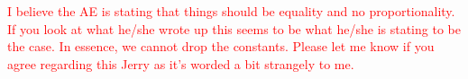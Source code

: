 \documentclass[letterpaper, parskip]{scrartcl}
\begin{document}
\textcolor{red}{I believe the AE is stating that things should be equality and no proportionality. If you look at what he/she wrote up this seems to be what he/she is stating to be the case. In essence, we cannot drop the constants. Please let me know if you agree regarding this Jerry as it's worded a bit strangely to me.}

	\clearpage
	
	\bigskip
	
	
	
\end{document}
